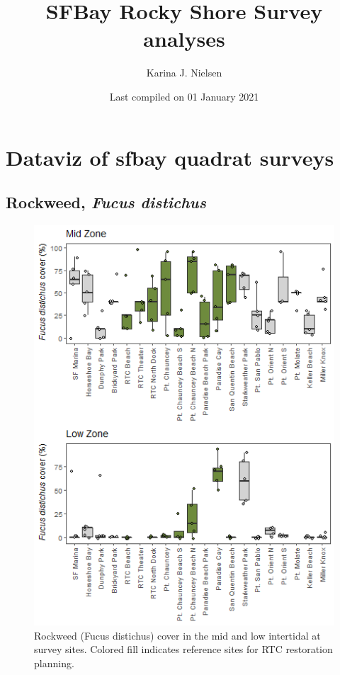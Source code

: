 \documentclass[
]{article}
\title{SFBay Rocky Shore Survey analyses}
\author{Karina J. Nielsen}
\date{Last compiled on 01 January 2021}
\begin{document}
\maketitle

{
\setcounter{tocdepth}{2}
\tableofcontents
}
\hypertarget{dataviz-of-sfbay-quadrat-surveys}{%
\section{Dataviz of sfbay quadrat surveys}\label{dataviz-of-sfbay-quadrat-surveys}}

\hypertarget{rockweed-fucus-distichus}{%
\subsection{\texorpdfstring{Rockweed, \emph{Fucus distichus}}{Rockweed, Fucus distichus}}\label{rockweed-fucus-distichus}}

\begin{figure}

\includegraphics{sfb_quadrats_files/figure-latex/rockweed-by-zone-site-fig-1} \hfill{}

\caption{ Rockweed (Fucus distichus) cover in the mid and low intertidal at survey sites. Colored fill indicates reference sites for RTC restoration planning.}\label{fig:rockweed-by-zone-site-fig}
\end{figure}
\end{document}
